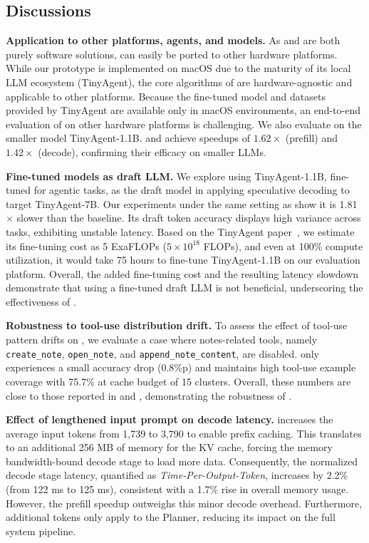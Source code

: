 \subsection{Discussions} \label{sect:eval_discussions}

{\bf Application to other platforms, agents, and models.}
As \prefill and \decode are both purely software solutions, \proposed can easily be ported to other hardware platforms. While our prototype is implemented on macOS due to the maturity of its local LLM ecosystem (TinyAgent), the core algorithms of \proposed are hardware-agnostic and applicable to other platforms. Because the fine-tuned model and datasets provided by TinyAgent are available only in macOS environments, an end-to-end evaluation of \proposed on other hardware platforms is challenging. We also evaluate \proposed on the smaller model TinyAgent-1.1B. \prefill and \decode achieve speedups of $1.62\times$ (prefill) and $1.42\times$ (decode), confirming their efficacy on smaller LLMs.

{\bf Fine-tuned models as draft LLM.}
We explore using TinyAgent-1.1B, fine-tuned for agentic tasks, as the draft model in applying speculative decoding to target TinyAgent-7B. Our experiments under the same setting as  show it is 1.81$\times$ slower than the baseline. Its draft token accuracy displays high variance across tasks, exhibiting unstable latency. Based on the TinyAgent paper~\cite{tinyagent}, we estimate its fine-tuning cost as 5 ExaFLOPs ($5\times10^{18}$ FLOPs), and even at 100\% compute utilization, it would take 75 hours to fine-tune TinyAgent-1.1B on our evaluation platform. Overall, the added fine-tuning cost and the resulting latency slowdown demonstrate that using a fine-tuned draft LLM is not beneficial, underscoring the effectiveness of \decode.

{\bf Robustness to tool-use distribution drift.}
To assess the effect of tool-use pattern drifts on \prefill, we evaluate a case where notes-related tools, namely \texttt{create\_note}, \texttt{open\_note}, and \texttt{append\_note\_content}, are disabled. \prefill only experiences a small accuracy drop (0.8\%p) and maintains high tool-use example coverage with 75.7\% at cache budget of 15 clusters. Overall, these numbers are close to those reported in  and , demonstrating the robustness of \prefill.

{\bf Effect of lengthened input prompt on decode latency.}
\prefill increases the average input tokens from 1,739 to 3,790 to enable prefix caching. This translates to an additional 256 MB of memory for the KV cache, forcing the memory bandwidth-bound decode stage to load more data. Consequently, the normalized decode stage latency, quantified as \emph{Time-Per-Output-Token}, increases by 2.2\% (from 122 ms to 125 ms), consistent with a 1.7\% rise in overall memory usage. However, the prefill speedup outweighs this minor decode overhead. Furthermore, additional tokens only apply to the Planner, reducing its impact on the full system pipeline.


